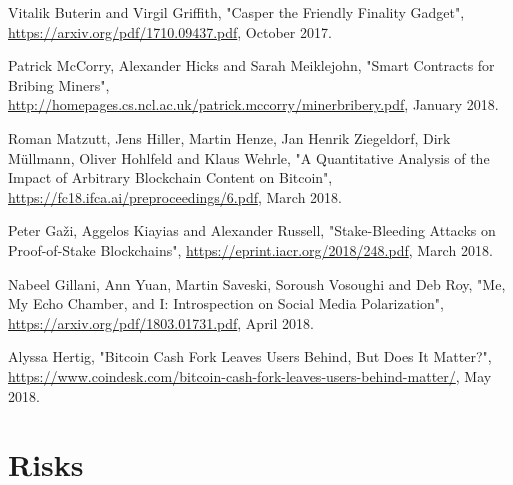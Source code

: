 \documentclass[12pt,a4paper]{article}
\begin{document}
\begin{thebibliography}{9}
Vitalik Buterin and Virgil Griffith,
"Casper the Friendly Finality Gadget",
\url{https://arxiv.org/pdf/1710.09437.pdf},
October 2017.

Patrick McCorry, Alexander Hicks and Sarah Meiklejohn,
"Smart Contracts for Bribing Miners",
\url{http://homepages.cs.ncl.ac.uk/patrick.mccorry/minerbribery.pdf},
January 2018.

Roman Matzutt, Jens Hiller, Martin Henze, Jan Henrik Ziegeldorf, Dirk Müllmann, Oliver Hohlfeld and Klaus Wehrle,
"A Quantitative Analysis of the Impact of Arbitrary Blockchain Content on Bitcoin",
\url{https://fc18.ifca.ai/preproceedings/6.pdf},
March 2018.

Peter Gaži, Aggelos Kiayias and Alexander Russell,
"Stake-Bleeding Attacks on Proof-of-Stake Blockchains",
\url{https://eprint.iacr.org/2018/248.pdf},
March 2018.

Nabeel Gillani, Ann Yuan, Martin Saveski, Soroush Vosoughi and Deb Roy,
"Me, My Echo Chamber, and I: Introspection on Social Media Polarization",
\url{https://arxiv.org/pdf/1803.01731.pdf},
April 2018.

Alyssa Hertig,
"Bitcoin Cash Fork Leaves Users Behind, But Does It Matter?",
\url{https://www.coindesk.com/bitcoin-cash-fork-leaves-users-behind-matter/},
May 2018.

\end{thebibliography}

\newpage
\printglossary[type=\acronymtype]
\printglossary

\newpage
\appendix

\section{Risks}
\end{document}
